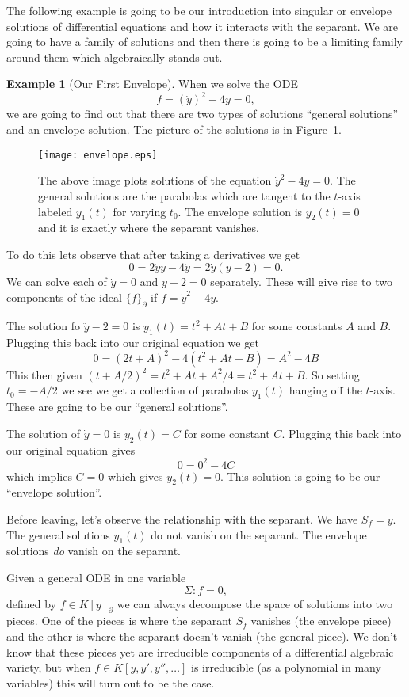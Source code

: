 \documentclass[12pt]{book}
\numberwithin{equation}{section}
\theoremstyle{definition}
\newtheorem{example}[theorem]{Example}
\theoremstyle{remark}
\begin{document}
The following example is going to be our introduction into singular or envelope solutions of differential equations and how it interacts with the separant.
We are going to have a family of solutions and then there is going to be a limiting family around them which algebraically stands out.
\begin{example}[Our First Envelope]
	When we solve the ODE
	 $$ f=(\dot{y})^2 - 4y =0,$$
	we are going to find out that there are two types of solutions ``general solutions'' and an envelope solution. 
	The picture of the solutions is in Figure~\ref{F:envelope}.
	\begin{figure}[]
		\begin{center}
			\texttt{[image: envelope.eps]}
		\end{center}
	\caption{The above image plots solutions of the equation $\dot{y}^2-4y=0$.
		The general solutions are the parabolas which are tangent to the $t$-axis labeled $y_1(t)$ for varying $t_0$. 
		The envelope solution is $y_2(t)=0$ and it is exactly where the separant vanishes.	
}\label{F:envelope}
	\end{figure}
	 
	To do this lets observe that after taking a derivatives we get 
	$$0=2\dot{y}\ddot{y}-4\dot{y} = 2\dot{y}(\ddot{y}-2)=0.$$
	We can solve each of $\dot{y}=0$ and $\ddot{y}-2=0$ separately. 
	These will give rise to two components of the ideal $\lbrace f \rbrace_{\partial}$ if $f = \dot{y}^2-4y$. 
	
	The solution fo $\ddot{y}-2=0$ is $y_1(t) = t^2 + At + B$ for some constants $A$ and $B$.
	Plugging this back into our original equation we get 
	$$0=(2t+A)^2 -4(t^2+At+B)=A^2-4B$$
	This then given $(t+A/2)^2=t^2+At +A^2/4=t^2+At+B$.
	So setting $t_0=-A/2$ we see we get a collection of parabolas $y_1(t)$ hanging off the $t$-axis.
	These are going to be our ``general solutions''.
	
	The solution of $\dot{y}=0$ is $y_2(t)=C$ for some constant $C$. 
	Plugging this back into our original equation gives 
	$$ 0=0^2-4C$$
	which implies $C=0$ which gives $y_2(t)=0$. 
	This solution is going to be our ``envelope solution''.
	
	Before leaving, let's observe the relationship with the separant. 
	We have $S_f = \dot{y}$.
	The general solutions $y_1(t)$ do not vanish on the separant. 
	The envelope solutions \emph{do} vanish on the separant.
\end{example}

Given a general ODE in one variable
 $$ \Sigma \colon f=0, $$
defined by $f \in K[y]_{\partial}$ we can always decompose the space of solutions into two pieces. 
One of the pieces is where the separant $S_f$ vanishes (the envelope piece) and the other is where the separant doesn't vanish (the general piece). 
We don't know that these pieces yet are irreducible components of a differential algebraic variety, but when $f \in K[y,y',y'',\ldots]$ is irreducible (as a polynomial in many variables) this will turn out to be the case. 
\end{document}
